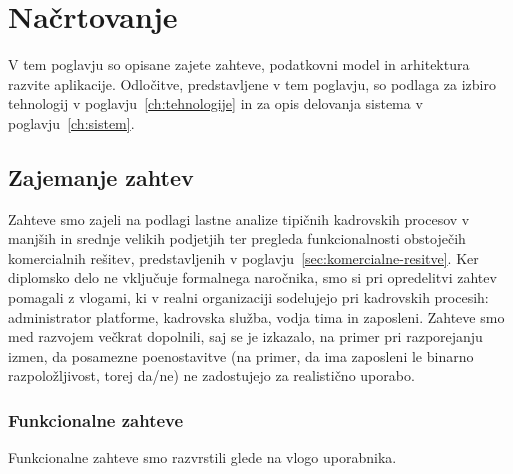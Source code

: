 \chapter{Načrtovanje}
\label{ch:nacrtovanje}


V tem poglavju so opisane zajete zahteve, podatkovni model in arhitektura razvite aplikacije. Odločitve, predstavljene v tem poglavju, so podlaga za izbiro tehnologij v poglavju~\ref{ch:tehnologije} in za opis delovanja sistema v poglavju~\ref{ch:sistem}.

\section{Zajemanje zahtev}
\label{sec:zahteve}

Zahteve smo zajeli na podlagi lastne analize tipičnih kadrovskih procesov v manjših in srednje velikih podjetjih ter pregleda funkcionalnosti obstoječih komercialnih rešitev, predstavljenih v poglavju~\ref{sec:komercialne-resitve}. Ker diplomsko delo ne vključuje formalnega naročnika, smo si pri opredelitvi zahtev pomagali z vlogami, ki v realni organizaciji sodelujejo pri kadrovskih procesih: administrator platforme, kadrovska služba, vodja tima in zaposleni. Zahteve smo med razvojem večkrat dopolnili, saj se je izkazalo, na primer pri razporejanju izmen, da posamezne poenostavitve (na primer, da ima zaposleni le binarno razpoložljivost, torej da/ne) ne zadostujejo za realistično uporabo.

\subsection{Funkcionalne zahteve}

Funkcionalne zahteve smo razvrstili glede na vlogo uporabnika.

